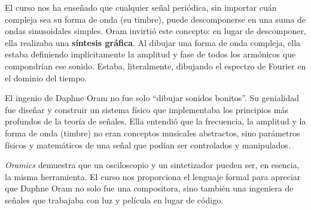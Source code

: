 \documentclass[paper=letter, fontsize=11pt, draft=false]{scrartcl}
\numberwithin{equation}{problemcounter} %
\numberwithin{figure}{problemcounter} %
\numberwithin{table}{problemcounter} %
\numberwithin{subsection}{problemcounter}
\begin{document}
El curso nos ha enseñado que cualquier señal periódica, sin importar cuán compleja sea su forma de onda (su timbre), puede descomponerse en una suma de ondas sinusoidales simples. Oram invirtió este concepto: en lugar de descomponer, ella realizaba una \textbf{síntesis gráfica}. Al dibujar una forma de onda compleja, ella estaba definiendo implícitamente la amplitud y fase de todos los armónicos que compondrían ese sonido. Estaba, literalmente, dibujando el espectro de Fourier en el dominio del tiempo.

El ingenio de Daphne Oram no fue solo ``dibujar sonidos bonitos''. Su genialidad fue diseñar y construir un sistema físico que implementaba los principios más profundos de la teoría de señales. Ella entendió que la frecuencia, la amplitud y la forma de onda (timbre) no eran conceptos musicales abstractos, sino parámetros físicos y matemáticos de una señal que podían ser controlados y manipulados.


\textit{Oramics} demuestra que un osciloscopio y un sintetizador pueden ser, en esencia, la misma herramienta. El curso nos proporciona el lenguaje formal para apreciar que Daphne Oram no solo fue una compositora, sino también una ingeniera de señales que trabajaba con luz y película en lugar de código.





\end{document}
